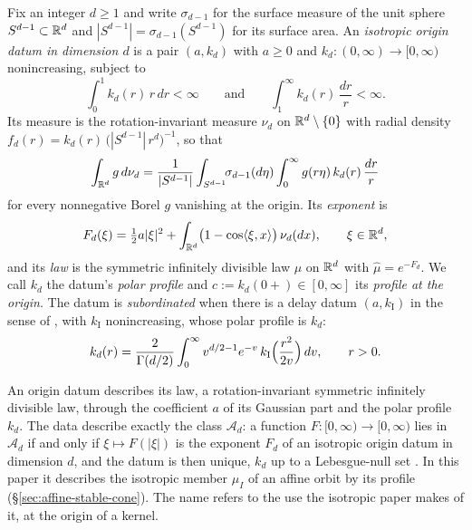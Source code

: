 \begin{definition}\label{def:isotropic-origin-datum}
Fix an integer $d \ge 1$ and write $\sigma_{d-1}$ for the surface measure of the unit sphere
$S^{d-1} \subset \mathbb{R}^d$ and $|S^{d-1}| = \sigma_{d-1}(S^{d-1})$ for its surface area. An
\emph{isotropic origin datum in dimension $d$} is a pair
$(a, k_d)$ with $a \ge 0$ and $k_d : (0,\infty) \to [0,\infty)$ nonincreasing, subject to
\[
  \int_0^1 k_d(r)\,r\,dr < \infty
  \qquad\text{and}\qquad
  \int_1^\infty k_d(r)\,\frac{dr}{r} < \infty .
\]
Its \Levy{} measure is the rotation-invariant measure $\nu_d$ on $\mathbb{R}^d \setminus \{0\}$ with radial
density $f_d(r) = k_d(r)\,\bigl(|S^{d-1}|\,r^d\bigr)^{-1}$, so that
\begin{equation}\label{eq:polar-decomposition}
  \int_{\mathbb{R}^d} g \,d\nu_d
   = \frac{1}{|S^{d-1}|}\int_{S^{d-1}}\!\!\sigma_{d-1}(d\eta)\int_0^\infty g(r\eta)\,k_d(r)\,\frac{dr}{r}
\end{equation}
for every nonnegative Borel $g$ vanishing at the origin. Its \emph{exponent} is
\begin{equation}\label{eq:isotropic-exponent}
  F_d(\xi) = \tfrac12 a|\xi|^2
   + \int_{\mathbb{R}^d}\bigl(1 - \cos\langle \xi, x\rangle\bigr)\,\nu_d(dx), \qquad \xi \in \mathbb{R}^d ,
\end{equation}
and its \emph{law} is the symmetric infinitely divisible law $\mu$ on $\mathbb{R}^d$ with
$\widehat\mu = e^{-F_d}$. We call $k_d$ the datum's \emph{polar profile} and
$c := k_d(0{+}) \in [0,\infty]$ its \emph{profile at the origin}. The datum is
\emph{subordinated} when there is a delay datum $(a, k_{\mathrm I})$ in the sense of
, with $k_{\mathrm I}$ nonincreasing, whose polar profile  is $k_d$:
\begin{equation}\label{eq:polar-profile-d}
  k_d(r) = \frac{2}{\Gamma(d/2)}\int_0^\infty v^{d/2-1}e^{-v}\,
    k_{\mathrm I}\Bigl(\frac{r^2}{2v}\Bigr)\,dv , \qquad r > 0 .
\end{equation}
\end{definition}

An origin datum describes its law, a rotation-invariant symmetric infinitely divisible law, through
the coefficient $a$ of its Gaussian part and the polar profile $k_d$.
The data describe exactly the class $\mathcal A_d$: a function $F : [0,\infty) \to [0,\infty)$ lies in
$\mathcal A_d$ if and only if $\xi \mapsto F(|\xi|)$ is the exponent $F_d$ of an isotropic origin
datum in dimension $d$, and the datum is then unique, $k_d$ up to a Lebesgue-null set
. In this paper it describes the isotropic member
$\mu_I$ of an affine orbit by its profile (\S\ref{sec:affine-stable-cone}). The name refers to the
use the isotropic paper makes of it, at the origin of a kernel.

